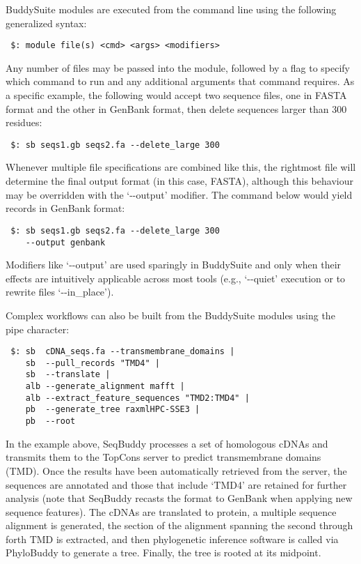 \documentclass[nogrid]{MBE}%
\begin{document}
BuddySuite modules are executed from the command line using the following generalized syntax:

\smallskip

{\small
\begin{verbatim}
 $: module file(s) <cmd> <args> <modifiers>
\end{verbatim}
}
\smallskip

Any number of files may be passed into the module, followed by a flag to specify which command to run and any additional arguments that command requires. As a specific example, the following would accept two sequence files, one in FASTA format and the other in GenBank format, then delete sequences larger than 300 residues:

\smallskip

{\small
\begin{verbatim}
 $: sb seqs1.gb seqs2.fa --delete_large 300
\end{verbatim}
}
\smallskip

Whenever multiple file specifications are combined like this, the rightmost file will determine the final output format (in this case, FASTA), although this behaviour may be overridden with the `-{}-output' modifier. The command below would yield records in GenBank format:

\smallskip

{\small
\begin{verbatim}
 $: sb seqs1.gb seqs2.fa --delete_large 300
    --output genbank
\end{verbatim}
}
\smallskip

Modifiers like \mbox{`-{}-output'} are used sparingly in BuddySuite and only when their effects are intuitively applicable across most tools (e.g., \mbox{`-{}-quiet'} execution or to rewrite files \mbox{`-{}-in\_place'}).

Complex workflows can also be built from the BuddySuite modules using the pipe character:

\smallskip
{\small
\begin{verbatim}
 $: sb  cDNA_seqs.fa --transmembrane_domains |
    sb  --pull_records "TMD4" |
    sb  --translate |
    alb --generate_alignment mafft |
    alb --extract_feature_sequences "TMD2:TMD4" |
    pb  --generate_tree raxmlHPC-SSE3 |
    pb  --root
\end{verbatim}
}

\smallskip

In the example above, SeqBuddy processes a set of homologous cDNAs and transmits them to the TopCons server \cite{Tsirigos:2015eo} to predict transmembrane domains (TMD). Once the results have been automatically retrieved from the server, the sequences are annotated and those that include `TMD4' are retained for further analysis (note that SeqBuddy recasts the format to GenBank when applying new sequence features). The cDNAs are translated to protein, a multiple sequence alignment is generated, the section of the alignment spanning the second through forth TMD is extracted, and then phylogenetic inference software is called via PhyloBuddy to generate a tree. Finally, the tree is rooted at its midpoint.
\end{document}
